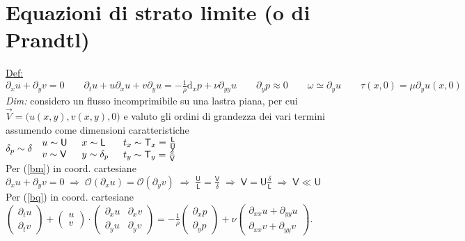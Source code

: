 \documentclass[11pt,a4paper]{report}
\newcommand{\de}{\mathrm d}
\begin{document}
{	\section{Equazioni di strato limite (o di Prandtl)}	\label{eq prandtl}
	\underline{Def:} $\partial_xu+\partial_yv=0\qquad\partial_tu+u\partial_xu+v\partial_yu=-\frac 1\rho\de _xp+\nu\partial_{yy}u\qquad\partial_yp\approx 0\qquad\omega\simeq\partial_yu\qquad\tau(x,0)=\mu\partial_yu(x,0)$\\
	\textit{Dim:} considero un flusso incomprimibile su una lastra piana, per cui $\vec V=\big(u(x,y),v(x,y),0\big)$ e valuto gli ordini di grandezza dei vari termini assumendo come dimensioni caratteristiche $\delta_p\sim\delta\quad\begin{array}{@{}l}u\sim\mathsf U\\v\sim\mathsf V\end{array}\quad\begin{array}{@{}l}x\sim\mathsf L\\y\sim \delta_p\end{array}\quad\begin{array}{@{}l}t_x\sim\mathsf T_x=\frac{\mathsf L}{\mathsf U}\\t_y\sim\mathsf T_y=\frac{\delta}{\mathsf V}\end{array}$\\
	Per (\ref{bm}) in coord. cartesiane $\partial_xu+\partial_yv=0\;\Rightarrow\;\mathcal O(\partial_xu)=\mathcal O(\partial_yv)\;\Rightarrow\;\frac{\mathsf U}{\mathsf L}=\frac{\mathsf V}\delta\;\Rightarrow\;\mathsf V=\mathsf U\frac{\delta}{\mathsf L}\;\Rightarrow\;\mathsf V\ll\mathsf U$\\
	Per (\ref{bq}) in coord. cartesiane $\begin{pmatrix}\partial_t u\\\partial_tv\end{pmatrix}+\begin{pmatrix}u\\v\end{pmatrix}\cdot\begin{pmatrix}\partial_xu&\partial_xv\\\partial_yu&\partial_yv\end{pmatrix}=-\frac 1\rho\begin{pmatrix}\partial_xp\\\partial_yp\end{pmatrix}+\nu\begin{pmatrix}\partial_{xx}u+\partial_{yy}u\\\partial_{xx}v+\partial_{yy}v\end{pmatrix}$.\\
}
\end{document}

